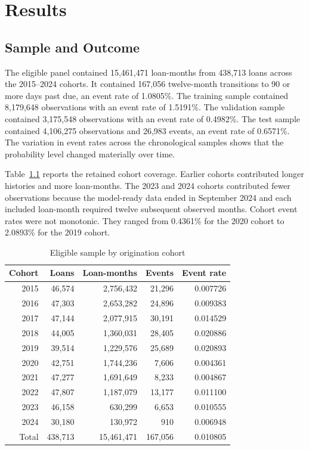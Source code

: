 \chapter{Results}
\label{chap:results}

\section{Sample and Outcome}

The eligible panel contained 15,461,471 loan-months from 438,713 loans across the 2015--2024 cohorts. It contained 167,056 twelve-month transitions to 90 or more days past due, an event rate of 1.0805\%. The training sample contained 8,179,648 observations with an event rate of 1.5191\%. The validation sample contained 3,175,548 observations with an event rate of 0.4982\%. The test sample contained 4,106,275 observations and 26,983 events, an event rate of 0.6571\%. The variation in event rates across the chronological samples shows that the probability level changed materially over time.

Table~\ref{tab:cohort-coverage} reports the retained cohort coverage. Earlier cohorts contributed longer histories and more loan-months. The 2023 and 2024 cohorts contributed fewer observations because the model-ready data ended in September 2024 and each included loan-month required twelve subsequent observed months. Cohort event rates were not monotonic. They ranged from 0.4361\% for the 2020 cohort to 2.0893\% for the 2019 cohort.

\begin{table}[htbp]
\centering
\caption{Eligible sample by origination cohort}
\label{tab:cohort-coverage}
\small
\begin{tabular}{rrrrr}
\toprule
Cohort & Loans & Loan-months & Events & Event rate \\
\midrule
2015 & 46,574 & 2,756,432 & 21,296 & 0.007726 \\
2016 & 47,303 & 2,653,282 & 24,896 & 0.009383 \\
2017 & 47,144 & 2,077,915 & 30,191 & 0.014529 \\
2018 & 44,005 & 1,360,031 & 28,405 & 0.020886 \\
2019 & 39,514 & 1,229,576 & 25,689 & 0.020893 \\
2020 & 42,751 & 1,744,236 & 7,606 & 0.004361 \\
2021 & 47,277 & 1,691,649 & 8,233 & 0.004867 \\
2022 & 47,807 & 1,187,079 & 13,177 & 0.011100 \\
2023 & 46,158 & 630,299 & 6,653 & 0.010555 \\
2024 & 30,180 & 130,972 & 910 & 0.006948 \\
\midrule
Total & 438,713 & 15,461,471 & 167,056 & 0.010805 \\
\bottomrule
\end{tabular}
\end{table}

